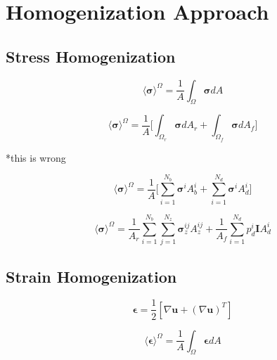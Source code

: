 \section{Homogenization Approach}

\subsection{Stress Homogenization}

\begin{equation}
\label{eqn:stress1}
\langle \boldsymbol{\sigma} \rangle^\Omega = 
\frac{1}{A} \int_\Omega \boldsymbol{\sigma} { dA}
\end{equation}

\begin{equation}
\label{eqn:stress2}
\langle \boldsymbol{\sigma} \rangle^\Omega = 
\frac{1}{A} \bigg \lbrack {\int_{\Omega_{r}} \boldsymbol{\sigma} { dA_r} + 
\int_{\Omega_{f}} \boldsymbol{\sigma} { dA_f}} \bigg \rbrack
\end{equation}

*this is wrong

\begin{equation}
\label{eqn:stress3}
\langle \boldsymbol{\sigma} \rangle^\Omega = 
\frac{1}{A} \bigg \lbrack \sum_{i=1}^{N_{b}} \boldsymbol{\sigma}^{i} A_{b}^{i} + 
\sum_{i=1}^{N_{d}} \boldsymbol{\sigma}^{i} A_{d}^{i} \bigg \rbrack
\end{equation}

\begin{equation}
\label{eqn:stress4}
\langle \boldsymbol{\sigma} \rangle^\Omega = 
\frac{1}{A_{r}} \sum_{i=1}^{N_{b}} \sum_{j=1}^{N_{z}} \boldsymbol{\sigma}_z^{ij} A_{z}^{ij} + 
\frac{1}{A_{f}} \sum_{i=1}^{N_{d}} p_d^{i} \textbf{I} A_{d}^{i}
\end{equation}

\subsection{Strain Homogenization}

\begin{equation}
\label{eqn:strain1}
\boldsymbol{\epsilon} = 
\frac{1}{2}  \left[ \nabla \mathbf{u} + \left( \nabla \mathbf{u} \right)^{T} \right]
\end{equation}

\begin{equation}
\label{eqn:strain2}
\langle \boldsymbol{\epsilon} \rangle^\Omega = 
\frac{1}{A} \int_\Omega \boldsymbol{\epsilon} { dA}
\end{equation}

